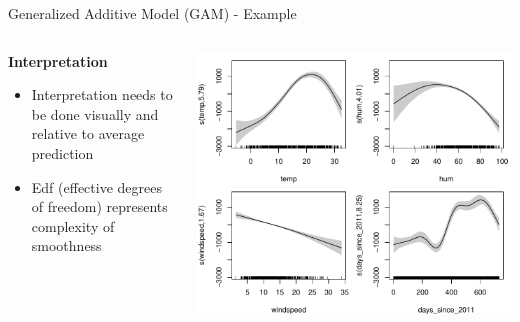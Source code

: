\documentclass[11pt,compress,t,notes=noshow, aspectratio=169, xcolor=table]{beamer}
\begin{document}
\begin{frame}{Generalized Additive Model (GAM) - Example}
\begin{columns}[T, totalwidth=\textwidth]
\begin{column}{0.45\textwidth}
\textbf{Interpretation}
\begin{itemize}
    \item Interpretation needs to be done visually and relative to average prediction
    \item Edf (effective degrees of freedom) represents complexity of smoothness
\end{itemize}
\end{column}
\hfill
\centering
\begin{column}{0.5\textwidth}
\includegraphics[width = \textwidth]{figure/gam_effects.pdf}
\end{column}
\end{columns}
\end{frame}

\end{document}
